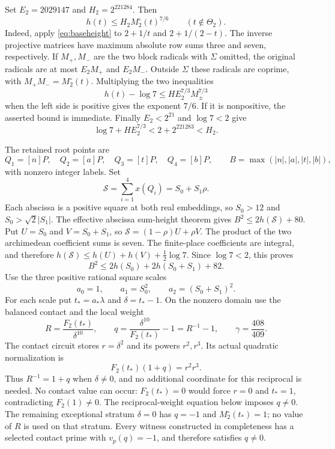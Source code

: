 \documentclass[11pt,a4paper]{article}
\begin{document}
Set $E_2=2029147$ and $H_2=2^{221284}$. Then
\begin{equation}\label{eq:contactheight}
                   h(t)\le H_2M_2^\circ(t)^{7/6}
                   \qquad(t\notin\Theta_2).
\end{equation}
Indeed, apply \eqref{eq:baseheight} to $2+1/t$ and $2+1/(2-t)$.
The inverse projective matrices have maximum absolute row sums three
and seven, respectively. If $M_+,M_-$ are the two block radicals
with $\Sigma$ omitted, the original radicals are at most $E_2M_+$
and $E_2M_-$. Outside $\Sigma$ these radicals are coprime, with
$M_+M_-=M_2^\circ(t)$. Multiplying the two inequalities
\[
             h(t)-\log7\le HE_2^{7/3}M_\pm^{7/3}
\]
when the left side is positive gives the exponent $7/6$.
If it is nonpositive, the asserted bound is immediate. Finally
$E_2<2^{21}$ and $\log7<2$ give
\[
                 \log7+HE_2^{7/3}<2+2^{221283}<H_2.
\]

The retained root points are
\[
 Q_1=[n]P,\quad Q_2=[a]P,\quad Q_3=[t]P,\quad Q_4=[b]P,
 \qquad B=\max(|n|,|a|,|t|,|b|),
\]
with nonzero integer labels. Set
\[
 \mathcal S=\sum_{i=1}^4x(Q_i)=S_0+S_1\rho.
\]
Each abscissa is a positive square at both real embeddings, so
$S_0>12$ and $S_0>\sqrt2|S_1|$. The effective abscissa sum-height
theorem \cite{Sums} gives $B^2\le2h(\mathcal S)+80$.
Put $U=S_0$ and $V=S_0+S_1$, so
$\mathcal S=(1-\rho)U+\rho V$. The product of the two archimedean
coefficient sums is seven. The finite-place coefficients are integral,
and therefore
$h(\mathcal S)\le h(U)+h(V)+\tfrac12\log7$.
Since $\log7<2$, this proves
\begin{equation}\label{eq:aggregate}
                  B^2\le2h(S_0)+2h(S_0+S_1)+82.
\end{equation}
Use the three positive rational square scales
\[
             a_0=1,\qquad a_1=S_0^2,\qquad a_2=(S_0+S_1)^2.
\]
For each scale put $t_*=a_*\lambda$ and $\delta=t_*-1$.
On the nonzero domain use the balanced contact and the local weight
\begin{equation}\label{eq:detector}
 R=\frac{F_2(t_*)}{\delta^{10}},\qquad
 q=\frac{\delta^{10}}{F_2(t_*)}-1=R^{-1}-1,
 \qquad \gamma=\frac{408}{409}.
\end{equation}
The contact circuit stores $r=\delta^2$ and its powers $r^2,r^3$.
Its actual quadratic normalization is
\begin{equation}\label{eq:clearing}
                         F_2(t_*)(1+q)=r^2r^3.
\end{equation}
Thus $R^{-1}=1+q$ when $\delta\ne0$, and no additional coordinate
for this reciprocal is needed. No contact value can occur:
$F_2(t_*)=0$ would force $r=0$ and $t_*=1$, contradicting $F_2(1)\ne0$.
The reciprocal-weight equation below imposes $q\ne0$. The remaining
exceptional stratum $\delta=0$ has $q=-1$ and
$M_2^\circ(t_*)=1$; no value of $R$ is used on that stratum.
Every witness constructed in completeness has a selected contact prime
with $v_p(q)=-1$, and therefore satisfies $q\ne0$.
\end{document}
